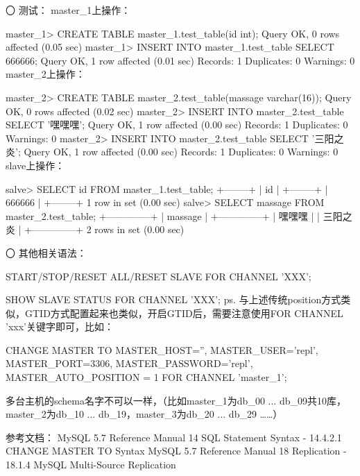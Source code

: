 〇 测试：
master_1上操作：

master_1> CREATE TABLE master_1.test_table(id int);
Query OK, 0 rows affected (0.05 sec)
master_1> INSERT INTO master_1.test_table SELECT 666666;
Query OK, 1 row affected (0.01 sec)
Records: 1 Duplicates: 0 Warnings: 0
master_2上操作：

master_2> CREATE TABLE master_2.test_table(massage varchar(16));
Query OK, 0 rows affected (0.02 sec)
master_2> INSERT INTO master_2.test_table SELECT '嘿嘿嘿';
Query OK, 1 row affected (0.00 sec)
Records: 1 Duplicates: 0 Warnings: 0
master_2> INSERT INTO master_2.test_table SELECT '三阳之炎';
Query OK, 1 row affected (0.00 sec)
Records: 1 Duplicates: 0 Warnings: 0
slave上操作：

salve> SELECT id FROM master_1.test_table;
+--------+
| id     |
+--------+
| 666666 |
+--------+
1 row in set (0.00 sec)
salve> SELECT massage FROM master_2.test_table;
+--------------+
| massage      |
+--------------+
| 嘿嘿嘿        |
| 三阳之炎      |
+--------------+
2 rows in set (0.00 sec)
 

〇 其他相关语法：

START/STOP/RESET ALL/RESET SLAVE FOR CHANNEL 'XXX';
 
SHOW SLAVE STATUS FOR CHANNEL 'XXX';
ps.
与上述传统position方式类似，GTID方式配置起来也类似，开启GTID后，需要注意使用FOR CHANNEL 'xxx'关键字即可，比如：

CHANGE MASTER TO 
    MASTER_HOST='',
    MASTER_USER='repl',
    MASTER_PORT=3306,
    MASTER_PASSWORD='repl',
    MASTER_AUTO_POSITION = 1
    FOR CHANNEL 'master_1';

多台主机的schema名字不可以一样，（比如master_1为db_00 ... db_09共10库，master_2为db_10 ... db_19，master_3为db_20 ... db_29 ……）



参考文档：
MySQL 5.7 Reference Manual 14 SQL Statement Syntax - 14.4.2.1 CHANGE MASTER TO Syntax
MySQL 5.7 Reference Manual 18 Replication - 18.1.4 MySQL Multi-Source Replication
